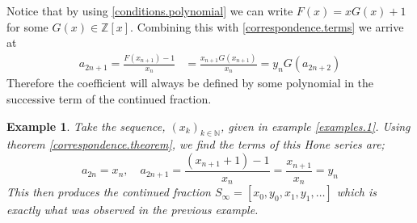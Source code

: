 \documentclass{article}
\newtheorem{example}{Example}[section]
\theoremstyle{remark}
\theoremstyle{definition}
\begin{document}
\iffalse
Note as a result of this theorem, we can write $z_n$ as a function of $a_{2n-1}$.
\begin{equation}
    z_n = F(x_n) = a_{2n-1}x_{n-1} + 1 = G(a_{2n-1})
\end{equation}

In practice, we can see that this means the odd terms are always integer multiples of the first intersequence as using the form of $F$ given in \eqref{conditions.polynomial} they can be rewritten
\begin{align*}
    \frac{F(x_{n+1})-1}{x_n} &= \frac{1}{x_n} \sum_{i=1}^N b_i x_{n+1}^i = \frac{x_{n+1}}{x_n} \sum_{i=1}^N b_i x_{n+1}^{i - 1} \\
    &= y_n \sum_{i=1}^N b_i x_{n+1}^{i - 1} = y_n \sum_{i=0}^N b_{i+1} x_{n+1}^i
\end{align*}
\fi
Notice that by using \eqref{conditions.polynomial} we can write $F(x) = x G(x) + 1$ for some $G(x) \in \mathbb{Z}[x]$. Combining this with \eqref{correspondence.terms} we arrive at
\begin{align*}
    a_{2n+1} = \frac{F(x_{n+1})-1}{x_n} &= \frac{x_{n+1} G(x_{n+1})}{x_n} = y_n G(a_{2n+2})
\end{align*}
Therefore the coefficient will always be defined by some polynomial in the successive term of the continued fraction.

\begin{example}
Take the sequence, $(x_k)_{k\in\mathbb{N}}$, given in example \ref{examples.1}. Using theorem \ref{correspondence.theorem}, we find the terms of this Hone series are;
\begin{equation*}
    a_{2n} = x_n, \quad a_{2n+1} = \frac{(x_{n+1} + 1) - 1}{x_n} = \frac{x_{n+1}}{x_n} = y_n
\end{equation*}
This then produces the continued fraction $S_\infty = [x_0,y_0,x_1,y_1,\dots]$ which is exactly what was observed in the previous example.
\end{example}
\end{document}
